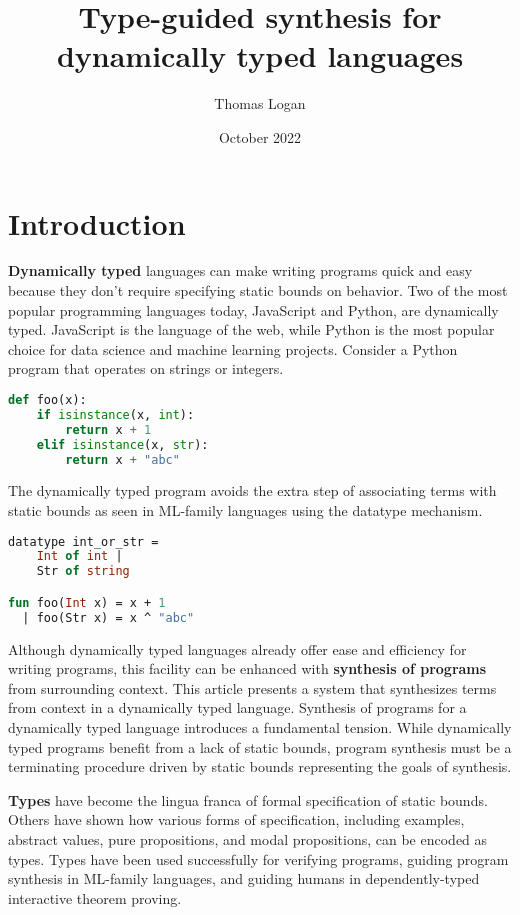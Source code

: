 \documentclass[sigplan,screen]{acmart}
\title{Type-guided synthesis for dynamically typed languages}
\author{Thomas Logan}
\date{October 2022}
\begin{document}
\maketitle

\section{Introduction}

\textbf{Dynamically typed} languages can make writing programs quick and easy 
because they don't require specifying static bounds on behavior.
Two of the most popular programming languages today, JavaScript and Python, 
are dynamically typed. 
JavaScript is the language of the web, while Python is the most popular choice
for data science and machine learning projects. 
Consider a Python program that operates on strings or integers. 

\begin{lstlisting}[language=Python]
def foo(x):
    if isinstance(x, int):
        return x + 1 
    elif isinstance(x, str): 
        return x + "abc"
\end{lstlisting}

\noindent The dynamically typed program avoids the extra step of associating terms with
static bounds as seen in ML-family languages using the datatype mechanism. 

\begin{lstlisting}[language=ML]
datatype int_or_str = 
    Int of int | 
    Str of string

fun foo(Int x) = x + 1
  | foo(Str x) = x ^ "abc"
\end{lstlisting}


Although dynamically typed languages already offer ease and efficiency for writing programs, 
this facility can be enhanced with \textbf{synthesis of programs} 
from surrounding context. 
This article presents a system that synthesizes terms from context 
in a dynamically typed language.
Synthesis of programs for a dynamically typed language introduces a fundamental tension. 
While dynamically typed programs benefit from a lack of static bounds, program synthesis
must be a terminating procedure driven by static bounds representing the goals of synthesis.   

\textbf{Types} have become the lingua franca of formal specification of static bounds.
Others have shown how various forms of specification, including examples, abstract values, 
pure propositions, and modal propositions, can be encoded as types.
Types have been used successfully for verifying programs, 
guiding program synthesis in ML-family languages, 
and guiding humans in dependently-typed interactive theorem proving. 
\end{document}
